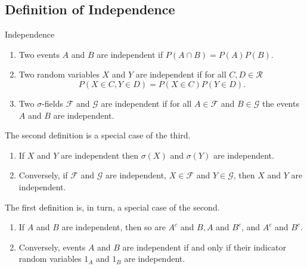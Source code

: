 \subsection{Definition of Independence}

\begin{definition}{Independence}{}
    \begin{enumerate}
        \item Two events $A$ and $B$ are independent if $P(A \cap B)=P(A) P(B)$.
        \item Two random variables $X$ and $Y$ are independent if for all $C,D\in\mathcal{R}$
        \begin{equation}
            P(X\in C,Y\in D)=P(X\in C)P(Y\in D).
        \end{equation}
        \item Two $\sigma$-fields $\mathcal{F}$ and $\mathcal{G}$ are independent if for all $A\in\mathcal{F}$ and $B\in\mathcal{G}$ the events $A$ and $B$ are independent.
    \end{enumerate}
\end{definition}

The second definition is a special case of the third.

\begin{theorem}{}{}
    \begin{enumerate}
        \item If $X$ and $Y$ are independent then $\sigma(X)$ and $\sigma(Y)$ are independent.
        \item Conversely, if $\mathcal{F}$ and $\mathcal{G}$ are independent, $X\in\mathcal{F}$ and $Y\in\mathcal{G}$, then $X$ and $Y$ are independent.
    \end{enumerate}
\end{theorem}

The first definition is, in turn, a special case of the second.

\begin{theorem}{}{}
    \begin{enumerate}
        \item If $A$ and $B$ are independent, then so are $A^{c}$ and $B, A$ and $B^{c}$, and $A^{c}$ and $B^{c}$.
        \item Conversely, events $A$ and $B$ are independent if and only if their indicator random variables $1_{A}$ and $1_{B}$ are independent.
    \end{enumerate}
\end{theorem}

